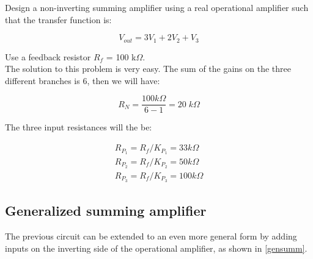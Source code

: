 \documentclass[../main.tex]{subfiles}
\begin{document}
Design a non-inverting summing amplifier using a real operational amplifier such that the transfer function is:

\begin{equation}
	V_{out} = 3V_{1} + 2V_2 + V_3
\end{equation}

Use a feedback resistor $R_f$ = 100 k$\Omega$.\\

The solution to this problem is very easy. The sum of the gains on the three different branches is 6, then we will have:

\begin{equation}
	R_N = \frac{100 \unit{k}\Omega}{6 -1} = 20 \; \unit{k}\Omega
\end{equation}

The three input resistances will the be:

\begin{equation}
\begin{aligned}
	R_{P_1} = R_f / K_{P_1} = 33 \unit{k}\Omega\\
	R_{P_2} = R_f / K_{P_2} = 50 \unit{k}\Omega\\
	R_{P_3} = R_f / K_{P_3} = 100 \unit{k}\Omega
\end{aligned}	
\end{equation}


\subsection{Generalized summing amplifier}

The previous circuit can be extended to an even more general form by adding inputs on the inverting side of the operational amplifier, as shown in \autoref{gensumm}.
\end{document}
